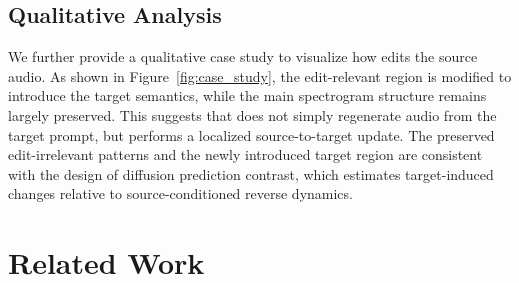 \begin{table}[t]
\centering
\scriptsize
\setlength{\tabcolsep}{2.5pt}
\renewcommand{\arraystretch}{0.92}
\caption{
Effect of dynamic target guidance on the Replacement task. The w/o Dynamic CFG setting replaces the increasing CFG schedule with a fixed scale.
}
\label{tab:dynamic_cfg}
\end{table}

\subsection{Qualitative Analysis}

We further provide a qualitative case study to visualize how \ourmethod{} edits the source audio.
As shown in Figure~\ref{fig:case_study}, the edit-relevant region is modified to introduce the target semantics, while the main spectrogram structure remains largely preserved.
This suggests that \ourmethod{} does not simply regenerate audio from the target prompt, but performs a localized source-to-target update.
The preserved edit-irrelevant patterns and the newly introduced target region are consistent with the design of diffusion prediction contrast, which estimates target-induced changes relative to source-conditioned reverse dynamics.

\section{Related Work}

